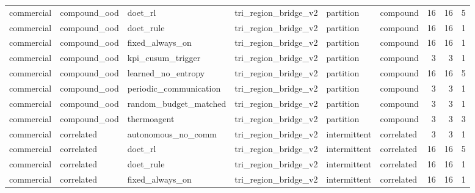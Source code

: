 \begin{table}
\begin{tabular}{llllllrrr}
  commercial &            compound\_ood &                doet\_rl & tri\_region\_bridge\_v2 &     partition &   compound &        16 &                        16 &                         5 \\
  commercial &            compound\_ood &              doet\_rule & tri\_region\_bridge\_v2 &     partition &   compound &        16 &                        16 &                         1 \\
  commercial &            compound\_ood &        fixed\_always\_on & tri\_region\_bridge\_v2 &     partition &   compound &        16 &                        16 &                         1 \\
  commercial &            compound\_ood &      kpi\_cusum\_trigger & tri\_region\_bridge\_v2 &     partition &   compound &         3 &                         3 &                         1 \\
  commercial &            compound\_ood &     learned\_no\_entropy & tri\_region\_bridge\_v2 &     partition &   compound &        16 &                        16 &                         5 \\
  commercial &            compound\_ood & periodic\_communication & tri\_region\_bridge\_v2 &     partition &   compound &         3 &                         3 &                         1 \\
  commercial &            compound\_ood &  random\_budget\_matched & tri\_region\_bridge\_v2 &     partition &   compound &         3 &                         3 &                         1 \\
  commercial &            compound\_ood &            thermoagent & tri\_region\_bridge\_v2 &     partition &   compound &         3 &                         3 &                         3 \\
  commercial &              correlated &     autonomous\_no\_comm & tri\_region\_bridge\_v2 &  intermittent & correlated &         3 &                         3 &                         1 \\
  commercial &              correlated &                doet\_rl & tri\_region\_bridge\_v2 &  intermittent & correlated &        16 &                        16 &                         5 \\
  commercial &              correlated &              doet\_rule & tri\_region\_bridge\_v2 &  intermittent & correlated &        16 &                        16 &                         1 \\
  commercial &              correlated &        fixed\_always\_on & tri\_region\_bridge\_v2 &  intermittent & correlated &        16 &                        16 &                         1 \\

\end{tabular}
\end{table}
